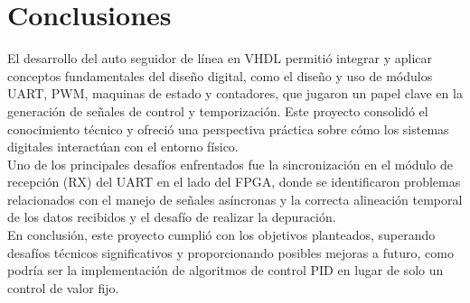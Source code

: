 \documentclass[12pt]{article}
\begin{document}
\newpage
\section{Conclusiones}
El desarrollo del auto seguidor de línea en VHDL permitió integrar y aplicar conceptos fundamentales del diseño digital, como el diseño y uso de módulos UART, PWM, maquinas de estado y contadores, que jugaron un papel clave en la generación de señales de control y temporización. Este proyecto consolidó el conocimiento técnico y ofreció una perspectiva práctica sobre cómo los sistemas digitales interactúan con el entorno físico.
\\

Uno de los principales desafíos enfrentados fue la sincronización en el módulo de recepción (RX) del UART en el lado del FPGA, donde se identificaron problemas relacionados con el manejo de señales asíncronas y la correcta alineación temporal de los datos recibidos y el desafío de realizar la depuración.
\\

En conclusión, este proyecto cumplió con los objetivos planteados, superando desafíos técnicos significativos y proporcionando posibles mejoras a futuro, como podría ser la implementación de algoritmos de control PID en lugar de solo un control de valor fijo.
\end{document}

